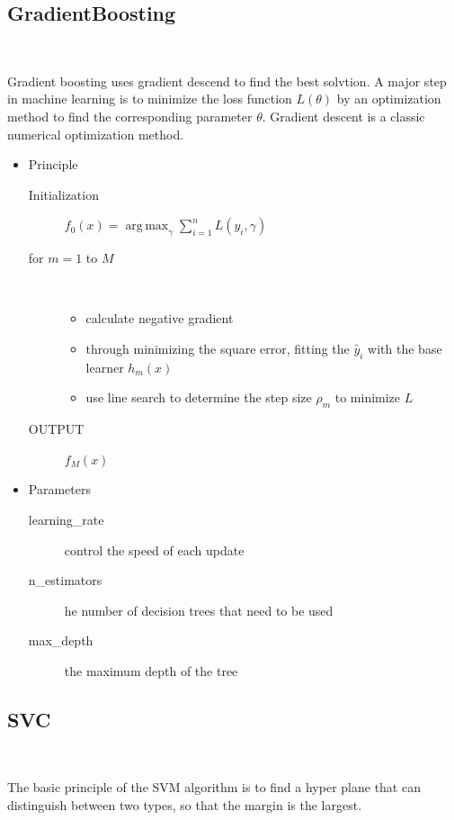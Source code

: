 \subsection{GradientBoosting}
\

Gradient boosting uses gradient descend 
to find the best solvtion.
A major step in machine learning is 
to minimize the loss function $L(θ)$ 
by an optimization method to 
find the corresponding parameter $θ$. 
Gradient descent is 
a classic numerical optimization method.

\begin{itemize}
	\item Principle
	
	\begin{description}
		\item[Initialization] $ f_{0}(x)=	
		\operatorname{arg\,max}_\gamma 
		\sum\nolimits_{i=1}^n L(y_i,\gamma)$
		
		\item[for $m=1$ to $M$] 
		\
		
		\begin{itemize}
			\item calculate negative gradient
			\item through minimizing the square error, 
			fitting the $ \tilde{y_i} $ 
			with the base learner $h_m(x)$
			\item use line search to 
			determine the step size $\rho_m$ to minimize $L$
		\end{itemize}
		
		\item[OUTPUT] $f_M(x)$
	\end{description}
	
	\item Parameters
	
	\begin{description}
		\item[learning_rate] control the speed of each update
		\item[n_estimators] he number of decision trees that 
		need to be used
		\item[max_depth] the maximum depth of the tree
	\end{description}
\end{itemize}
\subsection{SVC}
\

The basic principle of the SVM algorithm is 
to find a hyper plane that can 
distinguish between two types, 
so that the margin is the largest.

